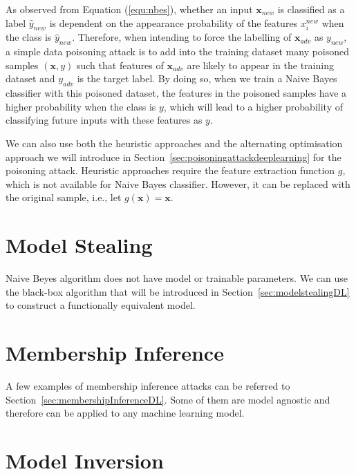 As observed from Equation (\ref{equ:nbes}), whether an input $\textbf{x}_{new}$  is classified as a label $\hat{y}_{new}$ is dependent on the appearance probability of the features $x_i^{new}$ when the class is $\hat{y}_{new}$. Therefore, when intending to force the labelling of $\textbf{x}_{adv}$ as ${y_{new}}$, a simple data poisoning attack is
to add into the training dataset many poisoned samples $(\textbf{x},y)$ such that features of $\textbf{x}_{adv}$ are likely to appear in the training dataset and $y_{adv}$ is the target label. By doing so, when we train a Naive Bayes classifier with this poisoned dataset, the features in the poisoned samples have a higher probability when the class is $y$, which will lead to a higher probability of classifying future inputs with these features as $y$. 

We can also use both the heuristic approaches and the alternating optimisation approach we will  introduce in Section~\ref{sec:poisoningattackdeeplearning} for the poisoning attack. Heuristic approaches require the feature extraction function $g$, which is not available for Naive Bayes classifier. However, it can be replaced with the original sample, i.e., let $g(\textbf{x})=\textbf{x}$.

\section{Model Stealing} 

Naive Beyes algorithm does not have model or trainable parameters. We can use the black-box algorithm that will be introduced in Section~\ref{sec:modelstealingDL} to construct a functionally equivalent model. 


\section{Membership Inference}

A few examples of membership inference attacks can be referred to Section~\ref{sec:membershipInferenceDL}. Some of them are model agnostic and therefore can be applied to any machine learning model.  


\section{Model Inversion}

